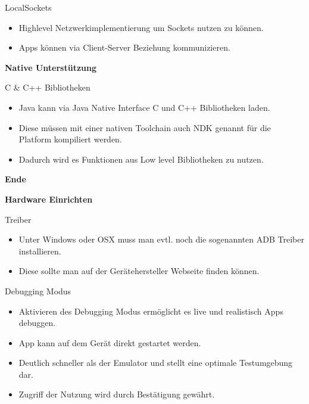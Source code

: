 \documentclass{beamer}
\begin{document}
\begin{frame}{LocalSockets}
\begin{itemize}
\item Highlevel Netzwerkimplementierung um Sockets nutzen zu können.
\item Apps können via Client-Server Beziehung kommunizieren.
\end{itemize}
\end{frame}

\begin{frame}
\begin{center}
\huge\textbf{Native Unterstützung}
\end{center}
\end{frame}

\begin{frame}{C \& C++ Bibliotheken}
\begin{itemize}
\item Java kann via Java Native Interface C und C++ Bibliotheken laden.
\item Diese müssen mit einer nativen Toolchain auch NDK genannt für die Platform kompiliert werden.
\item Dadurch wird es Funktionen aus Low level Bibliotheken zu nutzen.
\end{itemize}
\end{frame}

\begin{frame}
\begin{center}
\huge\textbf{Ende}
\end{center}
\end{frame}

\begin{frame}
\begin{center}
\huge\textbf{Hardware Einrichten}
\end{center}
\end{frame}

\begin{frame}{Treiber}
\begin{itemize}
\item Unter Windows oder OSX muss man evtl. noch die sogenannten ADB Treiber installieren.
\item Diese sollte man auf der Gerätehersteller Webseite finden können.
\end{itemize}
\end{frame}

\begin{frame}{Debugging Modus}
\begin{itemize}
\item Aktivieren des Debugging Modus ermöglicht es live und realistisch Apps debuggen.
\item App kann auf dem Gerät direkt gestartet werden.
\item Deutlich schneller als der Emulator und stellt eine optimale Testumgebung dar.
\item Zugriff der Nutzung wird durch Bestätigung gewährt.
\end{itemize}
\end{frame}
\end{document}
